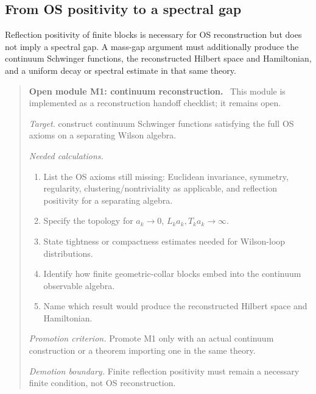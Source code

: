 \documentclass[11pt]{article}
\newenvironment{openmodule}[1]
{\begin{quote}\color{red!55!black}\textbf{Open module #1.}\ }
{\end{quote}}
\begin{document}
\subsection{From OS positivity to a spectral gap}

Reflection positivity of finite blocks is necessary for OS reconstruction but does not imply a spectral gap.  A mass-gap argument must additionally produce the continuum Schwinger functions, the reconstructed Hilbert space and Hamiltonian, and a uniform decay or spectral estimate in that same theory.

\begin{openmodule}{M1: continuum reconstruction}
This module is implemented as a reconstruction handoff checklist; it remains open.

\emph{Target.} construct continuum Schwinger functions satisfying the full OS axioms on a separating Wilson algebra.

\emph{Needed calculations.}
\begin{enumerate}[label=(\alph*)]
  \item List the OS axioms still missing: Euclidean invariance, symmetry, regularity, clustering/nontriviality as applicable, and reflection positivity for a separating algebra.
  \item Specify the topology for \(a_k\to0\), \(L_ka_k,T_ka_k\to\infty\).
  \item State tightness or compactness estimates needed for Wilson-loop distributions.
  \item Identify how finite geometric-collar blocks embed into the continuum observable algebra.
  \item Name which result would produce the reconstructed Hilbert space and Hamiltonian.
\end{enumerate}

\emph{Promotion criterion.} Promote M1 only with an actual continuum construction or a theorem importing one in the same theory.

\emph{Demotion boundary.} Finite reflection positivity must remain a necessary finite condition, not OS reconstruction.
\end{openmodule}
\end{document}
